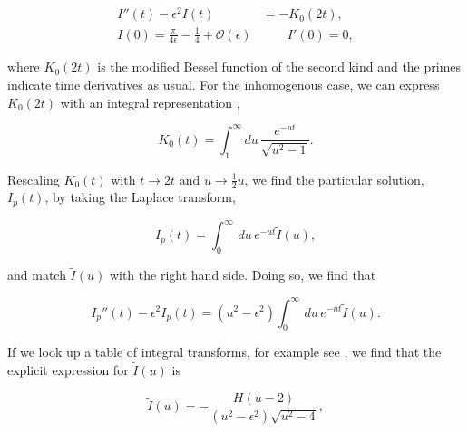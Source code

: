 \documentclass{article}
\numberwithin{equation}{section} %
\begin{document}
\begin{equation}
\begin{split}
I''(t) - \epsilon^2I(t) &= -K_0(2t),\\
I(0) = \frac{\pi}{4\epsilon} - \frac{1}{4} + \mathcal{O}(\epsilon) &\quad \quad I'(0) = 0,
\end{split}
\label{diff eq I}
\end{equation}

\noindent where $K_0(2t)$ is the modified Bessel function of the second kind\cite{bessel} and the primes indicate time derivatives as usual. For the inhomogenous case, we can express $K_0(2t)$ with an integral representation \cite{bessel},

%
%

\begin{equation}
K_0(t) = \int^\infty_1 du \, \frac{e^{-ut}}{\sqrt{u^2-1}}.
\end{equation}

%

\noindent Rescaling $K_0(t)$ with $t\rightarrow 2t\,\, \mathrm{and\,}\, u \rightarrow \frac{1}{2}u$, we find the particular solution, $I_p(t)$, by taking the Laplace transform\cite{laplace},

\begin{equation}
I_p(t) = \int^\infty_0 \, du \, e^{-ut} \tilde{I}(u),
\end{equation}

\noindent and match $\tilde{I}(u)$ with the right hand side. Doing so, we find that

\begin{equation}
I_p''(t) - \epsilon^2 I_p(t) = (u^2-\epsilon^2)\int^\infty_0 \, du \, e^{-ut} \tilde{I}(u).
\end{equation}

\noindent If we look up a table of integral transforms, for example see \cite{laplace}, we find that the explicit expression for $\tilde{I}(u)$ is

\begin{equation}
\tilde{I}(u) = -\frac{H(u-2)}{(u^2-\epsilon^2)\sqrt{u^2-4}},
\end{equation}
\end{document}
